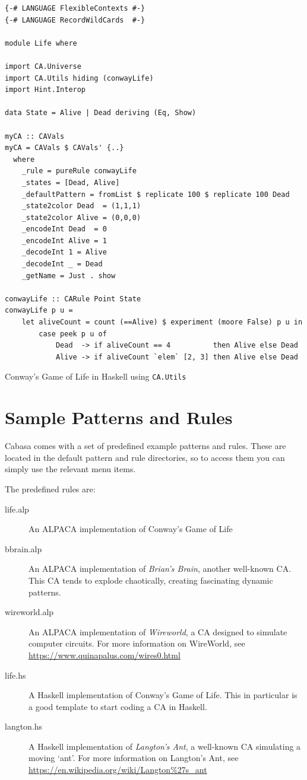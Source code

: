 \documentclass[oneside,a4paper]{memoir}
\begin{document}
\begin{listing}[!b]
\begin{verbatim}
{-# LANGUAGE FlexibleContexts #-}
{-# LANGUAGE RecordWildCards  #-}

module Life where

import CA.Universe
import CA.Utils hiding (conwayLife)
import Hint.Interop

data State = Alive | Dead deriving (Eq, Show)

myCA :: CAVals
myCA = CAVals $ CAVals' {..}
  where
    _rule = pureRule conwayLife
    _states = [Dead, Alive]
    _defaultPattern = fromList $ replicate 100 $ replicate 100 Dead
    _state2color Dead  = (1,1,1)
    _state2color Alive = (0,0,0)
    _encodeInt Dead  = 0
    _encodeInt Alive = 1
    _decodeInt 1 = Alive
    _decodeInt _ = Dead
    _getName = Just . show

conwayLife :: CARule Point State
conwayLife p u =
    let aliveCount = count (==Alive) $ experiment (moore False) p u in
        case peek p u of
            Dead  -> if aliveCount == 4          then Alive else Dead
            Alive -> if aliveCount `elem` [2, 3] then Alive else Dead
\end{verbatim}
\caption{Conway's Game of Life in Haskell using \texttt{CA.Utils}}
\label{lst:ugol}
\end{listing}

\appendix

\chapter{Sample Patterns and Rules}
\label{chap:samps}

Cabasa comes with a set of predefined example patterns and rules.
These are located in the default pattern and rule directories,
  so to access them you can simply use the relevant  menu items.

The predefined rules are:

\begin{description}
\item[life.alp] An ALPACA implementation of Conway's Game of Life
\item[bbrain.alp] An ALPACA implementation of \emph{Brian's Brain}, another well-known CA.
  This CA tends to explode chaotically, creating fascinating dynamic patterns.
\item[wireworld.alp] An ALPACA implementation of \emph{Wireworld}, a CA designed to simulate computer circuits.
  For more information on WireWorld, see \url{https://www.quinapalus.com/wires0.html}
\item[life.hs] A Haskell implementation of Conway's Game of Life.
  This in particular is a good template to start coding a CA in Haskell.
\item[langton.hs] A Haskell implementation of \textit{Langton's Ant}, a well-known CA simulating a moving `ant'.
  For more information on Langton's Ant, see \url{https://en.wikipedia.org/wiki/Langton%27s_ant}
\end{description}
\end{document}
